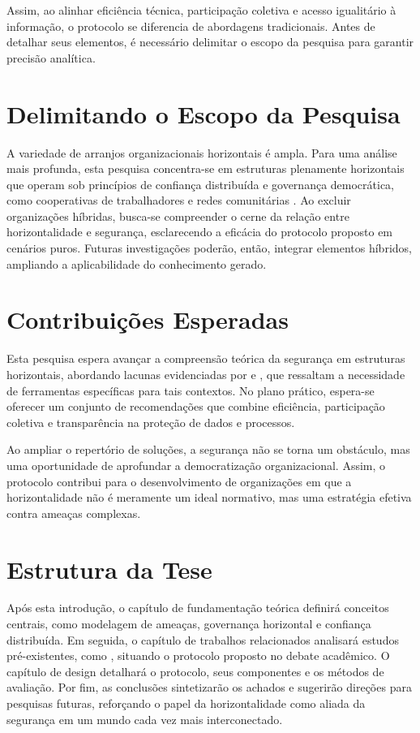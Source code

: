 Assim, ao alinhar eficiência técnica, participação coletiva
e acesso igualitário à informação, o protocolo se diferencia
de abordagens tradicionais. Antes de detalhar seus
elementos, é necessário delimitar o escopo da pesquisa para
garantir precisão analítica.

\section{Delimitando o Escopo da Pesquisa}
\label{sec:delimitacao_escopo}

A variedade de arranjos organizacionais horizontais é ampla.
Para uma análise mais profunda, esta pesquisa concentra-se
em estruturas plenamente horizontais que operam sob
princípios de confiança distribuída e governança
democrática, como cooperativas de trabalhadores e redes
comunitárias \cite{WorkerCooperativesinAmerica,
EverydayRevolutions}. Ao excluir organizações híbridas,
busca-se compreender o cerne da relação entre
horizontalidade e segurança, esclarecendo a eficácia do
protocolo proposto em cenários puros. Futuras investigações
poderão, então, integrar elementos híbridos, ampliando a
aplicabilidade do conhecimento gerado.

\section{Contribuições Esperadas}
\label{sec:contribuicoes_esperadas}

Esta pesquisa espera avançar a compreensão teórica da
segurança em estruturas horizontais, abordando lacunas
evidenciadas por
\cite{ThreatModelingAsABasisForSecurityRequirements} e
\cite{DemystifyingTheThreatModelingProcess}, que ressaltam a
necessidade de ferramentas específicas para tais contextos.
No plano prático, espera-se oferecer um conjunto de
recomendações que combine eficiência, participação coletiva
e transparência na proteção de dados e processos.

Ao ampliar o repertório de soluções, a segurança não se
torna um obstáculo, mas uma oportunidade de aprofundar a
democratização organizacional. Assim, o protocolo contribui
para o desenvolvimento de organizações em que a
horizontalidade não é meramente um ideal normativo, mas uma
estratégia efetiva contra ameaças complexas.

\section{Estrutura da Tese} \label{sec:estrutura_tese}

Após esta introdução, o capítulo de fundamentação teórica
definirá conceitos centrais, como modelagem de ameaças,
governança horizontal e confiança distribuída. Em seguida, o
capítulo de trabalhos relacionados analisará estudos
pré-existentes, como \cite{Colbac, AbcCrypto}, situando o
protocolo proposto no debate acadêmico. O capítulo de design
detalhará o protocolo, seus componentes e os métodos de
avaliação. Por fim, as conclusões sintetizarão os achados e
sugerirão direções para pesquisas futuras, reforçando o
papel da horizontalidade como aliada da segurança em um
mundo cada vez mais interconectado.
